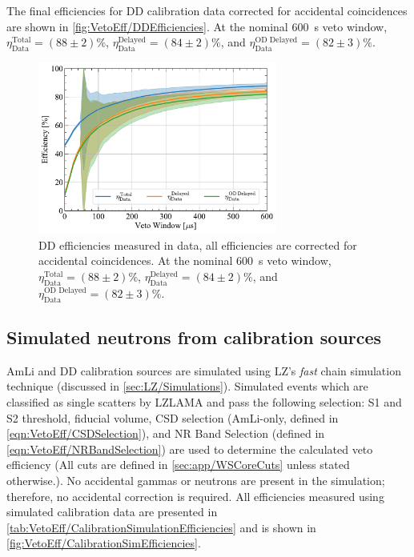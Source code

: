 The final efficiencies for DD calibration data corrected for accidental coincidences are shown in \autoref{fig:VetoEff/DDEfficiencies}. At the nominal 600~\textmu s veto window, $\eta^\text{Total}_\text{Data}=(88\pm2)\%$, $\eta^\text{Delayed}_\text{Data}=(84\pm2)\%$, and $\eta^\text{OD Delayed}_\text{Data}=(82\pm3)\%$.

\begin{figure}[h!]
    \centering
    \includegraphics[width=0.7\textwidth]{figures/VetoEfficiency/DDEfficiencies_Data.pdf}
    \caption[DD efficiencies measured in data, all efficiencies are corrected for accidental coincidences.]{DD efficiencies measured in data, all efficiencies are corrected for accidental coincidences. At the nominal 600~\textmu s veto window, $\eta^\text{Total}_\text{Data}=(88\pm2)\%$, $\eta^\text{Delayed}_\text{Data}=(84\pm2)\%$, and $\eta^\text{OD Delayed}_\text{Data}=(82\pm3)\%$.}
    \label{fig:VetoEff/DDEfficiencies}
\end{figure}

\subsection{Simulated neutrons from calibration sources}
AmLi and DD calibration sources are simulated using LZ's \textit{fast} chain simulation technique (discussed in \autoref{sec:LZ/Simulations}). Simulated events which are classified as single scatters by LZLAMA and pass the following selection: S1 and S2 threshold, fiducial volume, CSD selection (AmLi-only, defined in \autoref{eqn:VetoEff/CSDSelection}), and NR Band Selection (defined in \autoref{eqn:VetoEff/NRBandSelection}) are used to determine the calculated veto efficiency (All cuts are defined in \autoref{sec:app/WSCoreCuts} unless stated otherwise.). 
No accidental gammas or neutrons are present in the simulation; therefore, no accidental correction is required. All efficiencies measured using simulated calibration data are presented in \autoref{tab:VetoEff/CalibrationSimulationEfficiencies} and is shown in \autoref{fig:VetoEff/CalibrationSimEfficiencies}.

